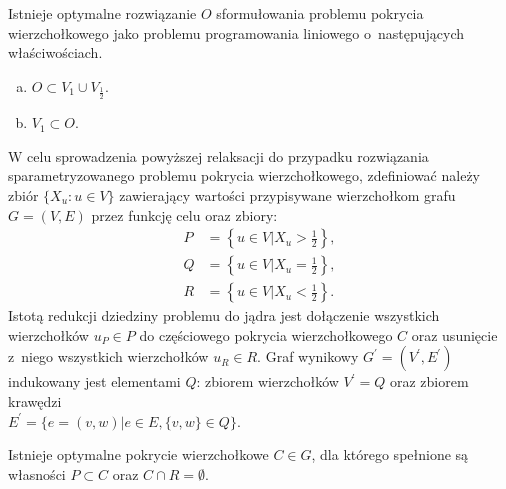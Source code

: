 \begin{theorem}
  Istnieje optymalne rozwiązanie $O$ sformułowania problemu pokrycia wierzchołkowego jako problemu programowania liniowego o~następujących właściwościach.
  \begin{enumerate}[(a)]
    \item $O \subset V_1 \cup V_{\frac{1}{2}}$.
    \item $V_1 \subset O$.
  \end{enumerate}
\end{theorem}
W celu sprowadzenia powyższej relaksacji do przypadku rozwiązania
sparametryzowanego problemu pokrycia wierzchołkowego, zdefiniować należy zbiór 
$\{ X_u : u \in V \}$ zawierający wartości przypisywane wierzchołkom grafu 
$G=(V,E)$ przez funkcję celu oraz zbiory:\\
\begin{align*}
P&=\left\{u \in V | X_u>\frac{1}{2}\right\},\\
Q&=\left\{u \in V | X_u=\frac{1}{2}\right\},\\
R&=\left\{u \in V | X_u<\frac{1}{2}\right\}.
\end{align*}
Istotą redukcji dziedziny problemu do jądra jest dołączenie wszystkich
wierzchołków $u_P \in P$ do częściowego pokrycia wierzchołkowego $C$ oraz 
usunięcie z~niego wszystkich wierzchołków $u_R \in R$.
Graf wynikowy $G^\prime=(V^\prime, E^\prime)$ indukowany jest elementami $Q$: 
zbiorem wierzchołków $V^\prime=Q$ oraz zbiorem krawędzi\\$E^\prime=\{e=(v, w)| e \in E, \{v, w\} \in Q\}$.
\begin{theorem}
  Istnieje optymalne pokrycie wierzchołkowe $C \in G$, dla którego spełnione są własności $P \subset C$ oraz $C \cap R = \emptyset$.
\end{theorem}
